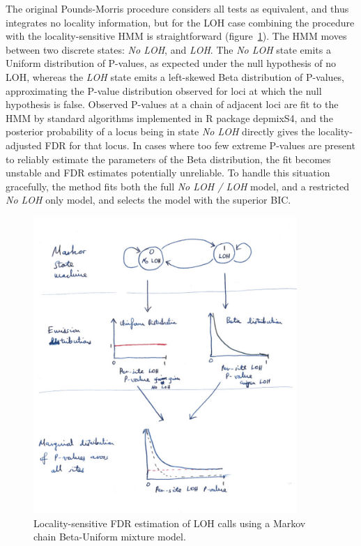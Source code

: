 \documentclass[dissertation.tex]{subfiles}
\begin{document}
The original Pounds-Morris procedure considers all tests as equivalent, and thus integrates no locality information, but for the \gls{LOH} case combining the procedure with the locality-sensitive \gls{HMM} is straightforward (figure~\ref{fig:comp_loh_hmm}).  The \gls{HMM} moves between two discrete states: \emph{No LOH}, and \emph{LOH}.  The \emph{No LOH} state emits a Uniform distribution of P-values, as expected under the null hypothesis of no \gls{LOH}, whereas the \emph{LOH} state emits a left-skewed Beta distribution of P-values, approximating the P-value distribution observed for loci at which the null hypothesis is false.  Observed P-values at a chain of adjacent loci are fit to the \gls{HMM} by standard algorithms implemented in R package depmixS4, and the posterior probability of a locus being in state \emph{No LOH} directly gives the locality-adjusted \gls{FDR} for that locus.  In cases where too few extreme P-values are present to reliably estimate the parameters of the Beta distribution, the fit becomes unstable and \gls{FDR} estimates potentially unreliable.  To handle this situation gracefully, the method fits both the full \emph{No LOH / LOH} model, and a restricted \emph{No LOH} only model, and selects the model with the superior \gls{BIC}.
\begin{figure}
\centering
\includegraphics[width=100mm]{resources/comp_loh_hmm.jpg}
\caption{Locality-sensitive FDR estimation of LOH calls using a Markov chain Beta-Uniform mixture model.\label{fig:comp_loh_hmm}}
\end{figure}
\end{document}
